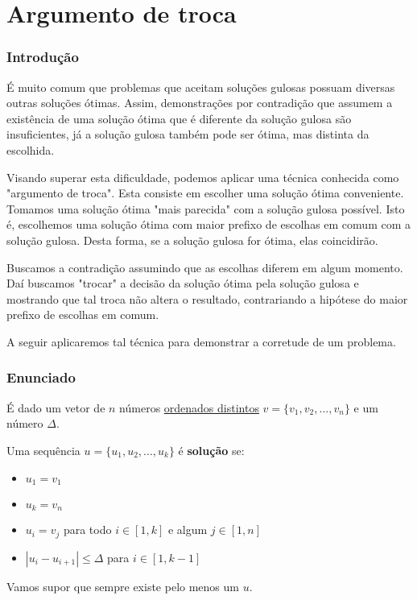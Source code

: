 \chapter{Argumento de troca}
\label{salto}

\subsection*{Introdução}

É muito comum que problemas que aceitam soluções gulosas possuam diversas outras soluções ótimas. Assim, demonstrações por contradição que assumem a existência de uma solução ótima que é diferente da solução gulosa são insuficientes, já a solução gulosa também pode ser ótima, mas distinta da escolhida.

Visando superar esta dificuldade, podemos aplicar uma técnica conhecida como "argumento de troca". Esta consiste em escolher uma solução ótima conveniente. Tomamos uma solução ótima "mais parecida" com a solução gulosa possível. Isto é, escolhemos uma solução ótima com maior prefixo de escolhas em comum com a solução gulosa. Desta forma, se a solução gulosa for ótima, elas coincidirão.

Buscamos a contradição assumindo que as escolhas diferem em algum momento. Daí buscamos "trocar" a decisão da solução ótima pela solução gulosa e mostrando que tal troca não altera o resultado, contrariando a hipótese do maior prefixo de escolhas em comum.

A seguir aplicaremos tal técnica para demonstrar a corretude de um problema.

\subsection*{Enunciado}

É dado um vetor de $n$ números \underline{ordenados distintos} $v = \{v_1, v_2, ..., v_n\}$ e um número $\Delta$.

Uma sequência $u = \{u_1, u_2, ..., u_k\}$ é \textbf{solução} se:
\begin{itemize}
    \item $u_1 = v_1$
    \item $u_k = v_n$
    \item $u_i = v_j$ para todo $i \in [1, k]$ e algum $j \in [1, n]$
    \item $|u_i - u_{i + 1}| \leq \Delta$ para $i \in [1, k - 1]$
\end{itemize}

Vamos supor que sempre existe pelo menos um $u$.

